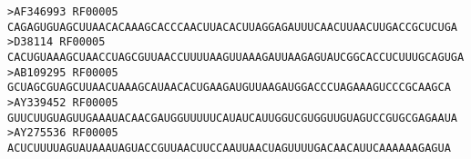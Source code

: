 \documentclass[]{article}
\begin{document}
  \begin{center}
    \begin{verbatim}
>AF346993 RF00005
CAGAGUGUAGCUUAACACAAAGCACCCAACUUACACUUAGGAGAUUUCAACUUAACUUGACCGCUCUGA
>D38114 RF00005
CACUGUAAAGCUAACCUAGCGUUAACCUUUUAAGUUAAAGAUUAAGAGUAUCGGCACCUCUUUGCAGUGA
>AB109295 RF00005
GCUAGCGUAGCUUAACUAAAGCAUAACACUGAAGAUGUUAAGAUGGACCCUAGAAAGUCCCGCAAGCA
>AY339452 RF00005
GUUCUUGUAGUUGAAAUACAACGAUGGUUUUUCAUAUCAUUGGUCGUGGUUGUAGUCCGUGCGAGAAUA
>AY275536 RF00005
ACUCUUUUAGUAUAAAUAGUACCGUUAACUUCCAAUUAACUAGUUUUGACAACAUUCAAAAAAGAGUA
    \end{verbatim}
  \end{center}
\end{document}
